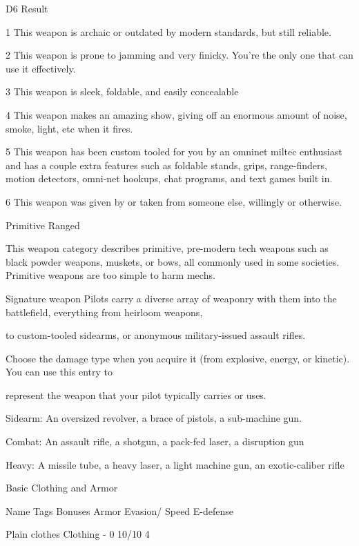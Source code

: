 D6      Result

 1       This weapon is archaic or outdated by modern standards, but still reliable.

 2       This weapon is prone to jamming and very finicky. You’re the only one that can use it effectively.

 3       This weapon is sleek, foldable, and easily concealable

 4       This weapon makes an amazing show, giving off an enormous amount of noise, smoke, light, etc when it
         fires.

 5       This weapon has been custom tooled for you by an omninet miltec enthusiast and has a couple extra
         features such as foldable stands, grips, range-finders, motion detectors, omni-net hookups, chat programs,
         and text games built in.

 6       This weapon was given by or taken from someone else, willingly or otherwise.

Primitive Ranged

This weapon category describes primitive, pre-modern tech weapons such as black powder weapons,
muskets, or bows, all commonly used in some societies. Primitive weapons are too simple to harm mechs.


Signature weapon
Pilots carry a diverse array of weaponry with them into the battlefield, everything from heirloom weapons,

to custom-tooled sidearms, or anonymous military-issued assault rifles.


Choose the damage type when you acquire it (from explosive, energy, or kinetic). You can use this entry to

represent the weapon that your pilot typically carries or uses.


Sidearm: An oversized revolver, a brace of pistols, a sub-machine gun.


Combat: An assault rifle, a shotgun, a pack-fed laser, a disruption gun

Heavy: A missile tube, a heavy laser, a light machine gun, an exotic-caliber rifle


                                             Basic Clothing and Armor


    Name                Tags                Bonuses                              Armor        Evasion/         Speed
                                                                                              E-defense

    Plain clothes       Clothing            -                                    0            10/10            4

